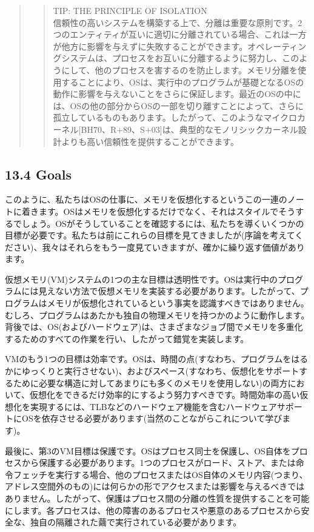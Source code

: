 \begin{quote}
\begin{quote}
TIP: THE PRINCIPLE OF ISOLATION\\
信頼性の高いシステムを構築する上で、分離は重要な原則です。2つのエンティティが互いに適切に分離されている場合、これは一方が他方に影響を与えずに失敗することができます。オペレーティングシステムは、プロセスをお互いに分離するように努力し、このようにして、他のプロセスを害するのを防止します。メモリ分離を使用することにより、OSは、実行中のプログラムが基礎となるOSの動作に影響を与えないことをさらに保証します。最近のOSの中には、OSの他の部分からOSの一部を切り離すことによって、さらに孤立しているものもあります。したがって、このようなマイクロカーネル{[}BH70、R+89、S+03{]}は、典型的なモノリシックカーネル設計よりも高い信頼性を提供することができます。
\end{quote}
\end{quote}

\hypertarget{goals}{%
\subsection*{13.4 Goals}\label{goals}}

このように、私たちはOSの仕事に、メモリを仮想化するというこの一連のノートに着きます。OSはメモリを仮想化するだけでなく、それはスタイルでそうするでしょう。OSがそうしていることを確認するには、私たちを導くいくつかの目標が必要です。私たちは前にこれらの目標を見てきましたが(序論を考えてください)、我々はそれらをもう一度見ていきますが、確かに繰り返す価値があります。

仮想メモリ(VM)システムの1つの主な目標は透明性です。OSは実行中のプログラムには見えない方法で仮想メモリを実装する必要があります。したがって、プログラムはメモリが仮想化されているという事実を認識すべきではありません。むしろ、プログラムはあたかも独自の物理メモリを持つかのように動作します。背後では、OS(およびハードウェア)は、さまざまなジョブ間でメモリを多重化するためのすべての作業を行い、したがって錯覚を実装します。

VMのもう1つの目標は効率です。OSは、時間の点(すなわち、プログラムをはるかにゆっくりと実行させない)、およびスペース(すなわち、仮想化をサポートするために必要な構造に対してあまりにも多くのメモリを使用しない)の両方において、仮想化をできるだけ効率的にするよう努力すべきです。時間効率の高い仮想化を実現するには、TLBなどのハードウェア機能を含むハードウェアサポートにOSを依存させる必要があります(当然のことながらこれについて学びます)。

最後に、第3のVM目標は保護です。OSはプロセス同士を保護し、OS自体をプロセスから保護する必要があります。1つのプロセスがロード、ストア、または命令フェッチを実行する場合、他のプロセスまたはOS自体のメモリ内容(つまり、アドレス空間外のもの)には何らかの形でアクセスまたは影響を与えるべきではありません。したがって、保護はプロセス間の分離の性質を提供することを可能にします。各プロセスは、他の障害のあるプロセスや悪意のあるプロセスから安全な、独自の隔離された繭で実行されている必要があります。

